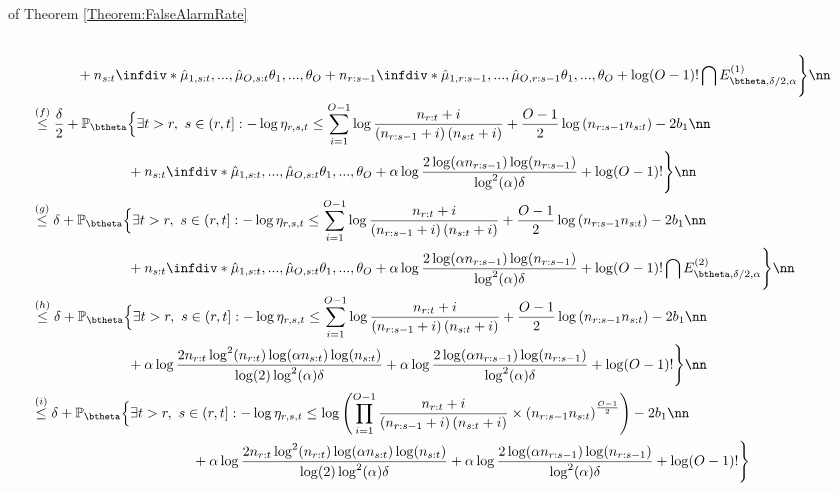 \documentclass{article} %
\begin{document}
\begin{myproof}{of Theorem \ref{Theorem:FalseAlarmRate}}
\begin{align}
   \\
	& \phantom{\mathbb{P}_{\btheta}  } 
 + n_{s:t}\infdiv*{\hat{\mu}_{1,s:t}, ..., \hat{\mu}_{O,s:t}}{\theta_1,...,\theta_O} 
+ n_{r:s-1}\infdiv*{\hat{\mu}_{1,r:s-1}, ..., \hat{\mu}_{O,r:s-1}}{\theta_1,...,\theta_O} + \log (O-1)!
\bigcap  E^{(1)}_{\btheta,\delta/2,\alpha} \Bigg\} \nn \\
 & \overset{(f)}{\leq} \frac{\delta}{2} + \mathbb{P}_{\btheta} \Big\{ \exists  t>r, \ s \in \left(r,t \right]:  - \log \eta_{r,s,t} \leq  
	\sum_{i=1}^{O-1} \log \frac{n_{r:t}+i}{\left( n_{r:s-1}+i  \right)\left( n_{s:t}+i  \right)}  + \frac{O-1}{2} \log \left( n_{r:s-1} n_{s:t}\right) - 2b_1 \nn
   \\
	& \phantom{\mathbb{P}_{\btheta} \Big\{ \exists  t>r, } 
 + n_{s:t}\infdiv*{\hat{\mu}_{1,s:t}, ..., \hat{\mu}_{O,s:t}}{\theta_1,...,\theta_O} + \alpha\log \frac{2\log(\alpha n_{r:s-1})\log(n_{r:s-1})}{\log^2(\alpha)\delta}
+ \log (O-1)! \Bigg\} \nn \\
 & \overset{(g)}{\leq} \delta + \mathbb{P}_{\btheta} \Big\{ \exists  t>r, \ s \in \left(r,t \right]:  - \log \eta_{r,s,t} \leq  
	\sum_{i=1}^{O-1} \log \frac{n_{r:t}+i}{\left( n_{r:s-1}+i  \right)\left( n_{s:t}+i  \right)}  + \frac{O-1}{2} \log \left( n_{r:s-1} n_{s:t}\right) - 2b_1 \nn 
   \\
	& \phantom{\mathbb{P}_{\btheta} \Big\{ \exists  t>r,  } 
 + n_{s:t}\infdiv*{\hat{\mu}_{1,s:t}, ..., \hat{\mu}_{O,s:t}}{\theta_1,...,\theta_O} + \alpha\log \frac{2\log(\alpha n_{r:s-1})\log(n_{r:s-1})}{\log^2(\alpha)\delta} + \log (O-1)!
 \bigcap  E^{(2)}_{\btheta,\delta/2,\alpha}  \Bigg\} \nn \\
  & \overset{(h)}{\leq} \delta + \mathbb{P}_{\btheta} \Big\{ \exists  t>r, \ s \in \left(r,t \right]:  - \log \eta_{r,s,t} \leq  
	\sum_{i=1}^{O-1} \log \frac{n_{r:t}+i}{\left( n_{r:s-1}+i  \right)\left( n_{s:t}+i  \right)}  + \frac{O-1}{2} \log \left( n_{r:s-1} n_{s:t}\right) - 2b_1 \nn
   \\
	& \phantom{\mathbb{P}_{\btheta} \Big\{ \exists  t>r,    } 
  + \alpha\log \frac{2n_{r:t}\log^2(n_{r:t})\log(\alpha n_{s:t})\log(n_{s:t})}{\log(2)\log^2(\alpha)\delta} + \alpha\log \frac{2\log(\alpha n_{r:s-1})\log(n_{r:s-1})}{\log^2(\alpha)\delta} + \log (O-1)! \Bigg\} \nn
\\
  & \overset{(i)}{\leq} \delta + \mathbb{P}_{\btheta} \Big\{ \exists  t>r, \ s \in \left(r,t \right]:  - \log \eta_{r,s,t} \leq  
	 \log \left( \prod_{i=1}^{O-1} \frac{n_{r:t}+i}{\left( n_{r:s-1}+i  \right)\left( n_{s:t}+i  \right)} \times \left( n_{r:s-1} n_{s:t} \right)^{\frac{O-1}{2}} \right) - 2b_1 \nn 
   \\
	& \phantom{\mathbb{P}_{\btheta} \Big\{ \exists  t>r, \ s \in \left(r,t \right]:   } 
  + \alpha\log \frac{2n_{r:t}\log^2(n_{r:t})\log(\alpha n_{s:t})\log(n_{s:t})}{\log(2)\log^2(\alpha)\delta} + \alpha\log \frac{2\log(\alpha n_{r:s-1})\log(n_{r:s-1})}{\log^2(\alpha)\delta} + \log (O-1)! \Bigg\} \label{eq::CondFalseAlarm}
	\end{align}



\end{myproof}
\end{document}
